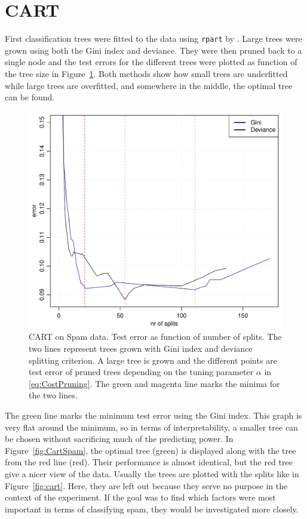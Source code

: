 \section{CART}
\label{sec:CARTsim}
First classification trees were fitted to the data using \verb+rpart+ by \cite{rpart}. Large trees were grown using both the Gini index and deviance. They were then pruned back to a single node and the test errors for the different trees were plotted as function of the tree size in Figure~\ref{fig:cartCPSpam}. 
Both methods show how small trees are underfitted while large trees are overfitted, and somewhere in the middle, the optimal tree can be found. 
%
\begin{figure}[h!tp]
\begin{center}
    \includegraphics[scale=0.5]{./figures/cartCPSpam.pdf}
\end{center}
\caption{CART on Spam data. Test error as function of number of splits. The two lines represent trees grown with Gini index and deviance splitting criterion. A large tree is grown and the different points are test error of pruned trees depending on the tuning parameter $\alpha$ in \eqref{eq:CostPruning}. The green and magenta line marks the minima for the two lines. }
\label{fig:cartCPSpam}
\end{figure}
%

The green line marks the minimum test error using the Gini index. This graph is very flat around the minimum, so in terms of interpretability, a smaller tree can be chosen without sacrificing much of the predicting power. In Figure~\ref{fig:CartSpam}, the optimal tree (green) is displayed along with the tree from the red line (red). Their performance is almost identical, but the red tree give a nicer view of the data. Usually the trees are plotted with the splits like in Figure~\ref{fig:cart}. Here, they are left out because they serve no purpose in the context of the experiment. If the goal was to find which factors were most important in terms of classifying spam, they would be investigated more closely.

